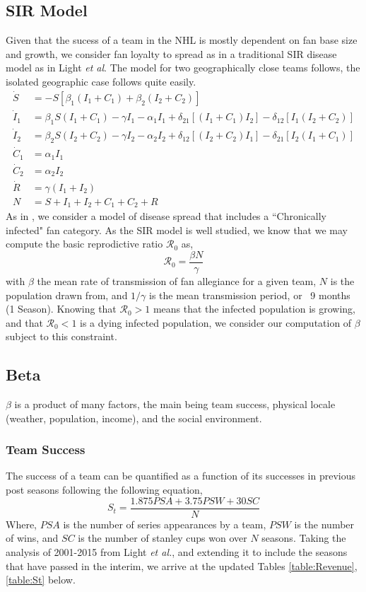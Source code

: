 \documentclass[11pt]{report}            %
\newcommand{\ro}{\mathcal{R}_0}
\begin{document}
\subsection*{SIR Model}
Given that the sucess of a team in the NHL is mostly dependent on fan base size and growth, we consider fan loyalty to spread as in a traditional SIR disease model as in Light \textit{et al}.\cite{light} The model for two geographically close teams follows, the isolated geographic case follows quite easily.
\begin{equation} \label{SIRMODEL}
\begin{split}
\dot{S} &= -S[\beta_1(I_1+C_1)+\beta_2(I_2+C_2)]\\
\dot{I}_1 &= \beta_1S(I_1+C_1)-\gamma I_1-\alpha_1I_1+\delta_{21}[(I_1+C_1)I_2]-\delta_{12}[I_1(I_2+C_2)]\\
\dot{I}_2 &= \beta_2S(I_2+C_2)-\gamma I_2-\alpha_2I_2+\delta_{12}[(I_2+C_2)I_1]-\delta_{21}[I_2(I_1+C_1)]\\
\dot{C}_1 &= \alpha_1I_1\\
\dot{C}_2 &= \alpha_2I_2\\
\dot{R} &= \gamma (I_1+I_2)\\
N &= S+I_1+I_2+C_1+C_2+R
\end{split}
\end{equation}
As in \cite{light}, we consider a model of disease spread that includes a ``Chronically infected" fan category. As the SIR model is well studied, we know that we may compute the basic reprodictive ratio $\ro$ as,
\[\ro =\frac{\beta N}{\gamma}\]
with $\beta$ the mean rate of transmission of fan allegiance for a given team, $N$ is the population drawn from, and $1/\gamma$ is the mean transmission period, or ~9 months (1 Season). Knowing that $\ro>1$ means that the infected population is growing, and that $\ro<1$ is a dying infected population, we consider our computation of $\beta$ subject to this constraint.
\subsection*{Beta}
$\beta$ is a product of many factors, the main being team success, physical locale (weather, population, income), and the social environment\cite{light}.
\subsubsection*{Team Success}
The success of a team can be quantified as a function of its successes in previous post seasons following the following equation,
\begin{equation}\label{Success}
S_t = \frac{1.875PSA+3.75PSW+30SC}{N}
\end{equation}
Where, $PSA$ is the number of series appearances by a team, $PSW$ is the number of wins, and $SC$ is the number of stanley cups won over $N$ seasons. Taking the analysis of 2001-2015 from Light \textit{et al.}\cite{light}, and extending it to include the seasons that have passed in the interim, we arrive at the updated Tables \ref{table:Revenue}, \ref{table:St} below.
\end{document}
